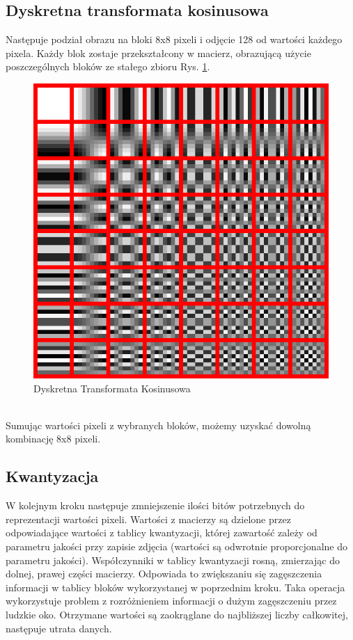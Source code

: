 \documentclass[a4paper, 12pt]{article}
\begin{document}
\subsection{Dyskretna transformata kosinusowa}
Następuje podział obrazu na bloki 8x8 pixeli i odjęcie 128 od wartości każdego pixela.
Każdy blok zostaje przekształcony w macierz, obrazującą użycie poszczególnych bloków ze stałego zbioru Rys. \ref{fig:DCT}.
\begin{figure}[h!]
	\begin{center}
	\includegraphics[width=0.4\columnwidth]{DCT.png}
	\caption{Dyskretna Transformata Kosinusowa}
	\label{fig:DCT}
\end{center}
\end{figure}
\\
Sumując wartości pixeli z wybranych bloków, możemy uzyskać dowolną kombinację 8x8 pixeli.
\subsection{Kwantyzacja}
W kolejnym kroku następuje zmniejszenie ilości bitów potrzebnych do reprezentacji wartości pixeli.
Wartości z macierzy są dzielone przez odpowiadające wartości z tablicy kwantyzacji,
której zawartość zależy od parametru jakości przy zapisie zdjęcia (wartości są odwrotnie proporcjonalne do parametru jakości).
Współczynniki w tablicy kwantyzacji rosną, zmierzając do dolnej, prawej części macierzy.
Odpowiada to zwiększaniu się zagęszczenia informacji w tablicy bloków wykorzystanej w poprzednim kroku.
Taka operacja wykorzystuje problem z rozróżnieniem informacji o dużym zagęszczeniu przez ludzkie oko.
Otrzymane wartości są zaokrąglane do najbliższej liczby całkowitej, następuje utrata danych.
\end{document}
